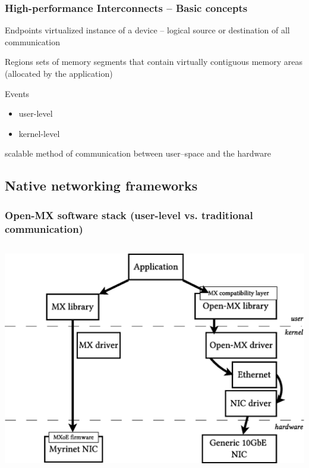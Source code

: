 \documentclass[red,slidestop,notes,compress,mathserif]{beamer}
\begin{document}
\begin{frame}
\frametitle{High-performance Interconnects -- Basic concepts}
        \begin{block}{Endpoints}
                virtualized instance of a device -- logical source or destination of all communication
        \end{block}
        \begin{block}{Regions}
                sets of memory segments that contain virtually contiguous memory areas (allocated by the application)
        \end{block}
        \begin{block}{Events}
                \begin{itemize}
                \item user-level
                \item kernel-level
                \end{itemize}
                scalable method of communication between user--space and the hardware
        \end{block}
\end{frame}

\subsection{Native networking frameworks}
\begin{frame}
\frametitle{Open-MX software stack (user-level vs. traditional communication)}
\begin{columns}
\includegraphics[width=\textwidth]{figs/bare/open-mx-default.eps}
\end{columns}
\end{frame}
\end{document}
